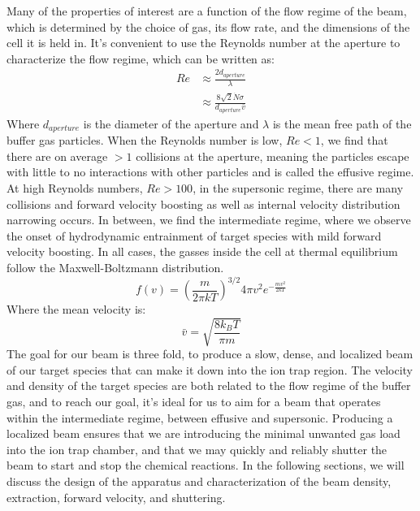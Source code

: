 Many of the properties of interest are a function of the flow regime of the beam, which is determined by the choice of gas, its flow rate, and the dimensions of the cell it is held in. It's convenient to use the Reynolds number at the aperture to characterize the flow regime, which can be written as:
\begin{align}
	Re & \approx \frac{2 d_{aperture}}{\lambda} \nonumber \\
	& \approx \frac{8\sqrt{2} \dot{N} \sigma}{d_{aperture} \bar{v}} \label{eq: reynolds}
\end{align}
Where $d_{aperture}$ is the diameter of the aperture and $\lambda$ is the mean free path of the buffer gas particles.\cite{Hutzler2012} When the Reynolds number is low, $Re<1$, we find that there are on average $>1$ collisions at the aperture, meaning the particles escape with little to no interactions with other particles and is called the effusive regime. At high Reynolds numbers, $Re>100$, in the supersonic regime, there are many collisions and forward velocity boosting as well as internal velocity distribution narrowing occurs. In between, we find the intermediate regime, where we observe the onset of hydrodynamic entrainment of target species with mild forward velocity boosting. In all cases, the gasses inside the cell at thermal equilibrium follow the Maxwell-Boltzmann distribution.
\begin{equation}
	f(v) = \left(\frac{m}{2 \pi k T}\right)^{3/2}4 \pi v^2 e^{-\frac{m v^2}{2 k T}}
	\label{eq: mb_distribution}
\end{equation}
Where the mean velocity is:
\begin{equation}
	\bar{v} = \sqrt{\frac{8 k_B T}{\pi m}}
	\label{eq: mb_mean}
\end{equation}
The goal for our beam is three fold, to produce a slow, dense, and localized beam of our target species that can make it down into the ion trap region. The velocity and density of the target species are both related to the flow regime of the buffer gas, and to reach our goal, it's ideal for us to aim for a beam that operates within the intermediate regime, between effusive and supersonic. Producing a localized beam ensures that we are introducing the minimal unwanted gas load into the ion trap chamber, and that we may quickly and reliably shutter the beam to start and stop the chemical reactions. In the following sections, we will discuss the design of the apparatus and characterization of the beam density, extraction, forward velocity, and shuttering.
